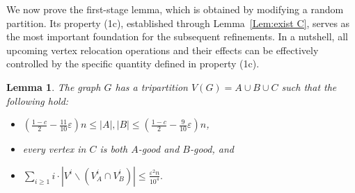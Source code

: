 \documentclass{aic}
\newtheorem{lemma}[dfn]{Lemma}
\begin{document}
	We now prove the first-stage lemma, which is obtained by modifying a random partition.
	Its property (1c), established through Lemma~\ref{Lem:exist C}, serves as the most important foundation for the subsequent refinements.
	In a nutshell, all upcoming vertex relocation operations and their effects can be effectively controlled by the specific quantity defined in property (1c).
	
	
	
	\begin{lemma}\label{Lem:indegree-tripar1}
		The graph $G$ has a tripartition $V(G)=A\cup B\cup C$ such that the following hold:
		\begin{itemize}
			\item [(1a).] $\left(\frac{1-c}{2}-\frac{11}{10}\varepsilon\right)n\leq |A|,|B|\leq \left(\frac{1-c}{2}-\frac{9}{10}\varepsilon\right)n$,
			\item [(1b).]  every vertex in $C$ is both $A$-good and $B$-good, and
			\item [(1c).] $\sum_{i\ge 1} i\cdot |V^i\backslash (V^i_A\cap V^i_B)|\leq \frac{\varepsilon^2n}{10^4}.$
		\end{itemize}
	\end{lemma}
	
\end{document}
